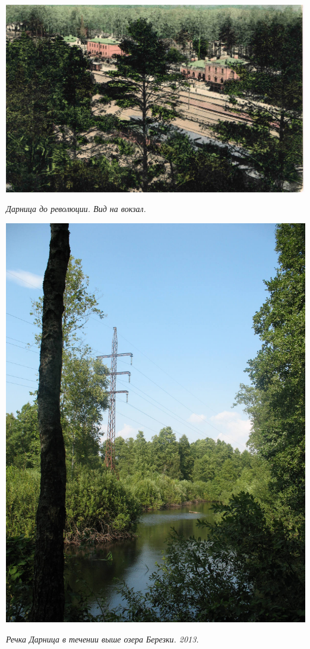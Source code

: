 \begin{center}
\includegraphics[width=\linewidth]{lpix/darn02.jpg}

\textit{Дарница до революции. Вид на вокзал.}
\end{center}

\vspace*{\fill}

\newpage

\vspace*{\fill}

\begin{center}
\includegraphics[width=\linewidth]{lpix/darn-reka.jpg}

\textit{Речка Дарница в течении выше озера Березки. 2013.}
\end{center}

